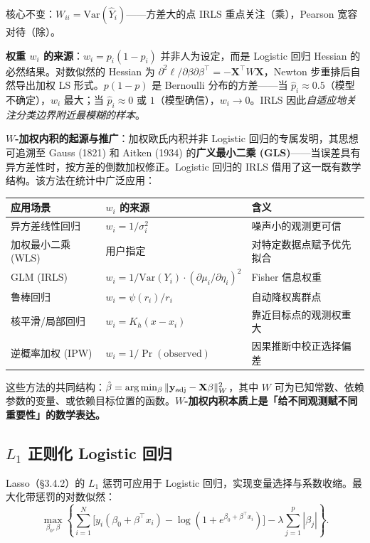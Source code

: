 核心不变：$W_{ii} = \mathrm{Var}(\hat{Y}_i)$——方差大的点 IRLS 重点关注（乘），Pearson 宽容对待（除）。

\textbf{权重 $w_i$ 的来源}：$w_i = p_i(1-p_i)$ 并非人为设定，而是 Logistic 回归 Hessian 的必然结果。对数似然的 Hessian 为 $\partial^2\ell/\partial\beta\partial\beta^\top = -\mathbf{X}^\top W \mathbf{X}$，Newton 步重排后自然导出加权 LS 形式。$p(1-p)$ 是 Bernoulli 分布的方差——当 $\hat{p}_i \approx 0.5$（模型不确定），$w_i$ 最大；当 $\hat{p}_i \approx 0$ 或 $1$（模型确信），$w_i \to 0$。IRLS 因此\emph{自适应地关注分类边界附近最模糊的样本}。

\textbf{$W$-加权内积的起源与推广}：加权欧氏内积并非 Logistic 回归的专属发明，其思想可追溯至 Gauss (1821) 和 Aitken (1934) 的\textbf{广义最小二乘 (GLS)}——当误差具有异方差性时，按方差的倒数加权修正。Logistic 回归的 IRLS 借用了这一既有数学结构。该方法在统计中广泛应用：

\begin{center}
\begin{tabular}{lll}
\toprule
应用场景 & $w_i$ 的来源 & 含义 \\
\midrule
异方差线性回归 & $w_i = 1/\sigma_i^2$ & 噪声小的观测更可信 \\
加权最小二乘 (WLS) & 用户指定 & 对特定数据点赋予优先拟合 \\
GLM (IRLS) & $w_i = 1/\mathrm{Var}(Y_i)\cdot(\partial\mu_i/\partial\eta_i)^2$ & Fisher 信息权重 \\
鲁棒回归 & $w_i = \psi(r_i)/r_i$ & 自动降权离群点 \\
核平滑/局部回归 & $w_i = K_h(x-x_i)$ & 靠近目标点的观测权重大 \\
逆概率加权 (IPW) & $w_i = 1/\Pr(\text{observed})$ & 因果推断中校正选择偏差 \\
\bottomrule
\end{tabular}
\end{center}

这些方法的共同结构：$\hat{\beta} = \arg\min_\beta \|\mathbf{y}_{\mathrm{adj}} - \mathbf{X}\beta\|_W^2$，其中 $W$ 可为已知常数、依赖参数的变量、或依赖目标位置的函数。\textbf{$W$-加权内积本质上是「给不同观测赋不同重要性」的数学表达。}


\subsection{$L_1$ 正则化 Logistic 回归}

Lasso（§3.4.2）的 $L_1$ 惩罚可应用于 Logistic 回归，实现变量选择与系数收缩。最大化带惩罚的对数似然：
\begin{equation}\label{eq:l1_logistic}
    \max_{\beta_0, \beta} \left\{ \sum_{i=1}^{N} \big[ y_i(\beta_0 + \beta^\top x_i) - \log(1 + e^{\beta_0 + \beta^\top x_i}) \big] - \lambda \sum_{j=1}^{p} |\beta_j| \right\}.
\end{equation}


